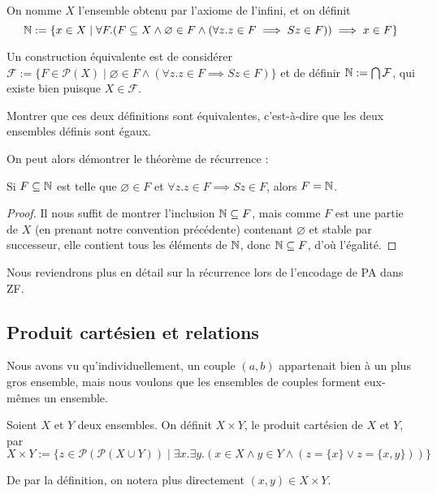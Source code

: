 \begin{defi}
    On nomme $X$ l'ensemble obtenu par l'axiome de l'infini, et on définit $$\mathbb{N} := \{ x \in X \mid \forall F.(F\subseteq X \land \varnothing \in F\land (\forall z.z\in F\implies Sz \in F))\implies x\in F\}$$

    Un construction équivalente est de considérer $\mathcal F := \{F\in\mathcal P(X)\mid \varnothing \in F \land (\forall z. z\in F \implies Sz \in F)\}$ et de définir $\mathbb{N} := \bigcap \mathcal F$, qui existe bien puisque $X\in\mathcal F$.
\end{defi}

\begin{exo}
    Montrer que ces deux définitions sont équivalentes, c'est-à-dire que les deux ensembles définis sont égaux.
\end{exo}

On peut alors démontrer le théorème de récurrence :

\begin{prop}[Récurrence]
    Si $F\subseteq \mathbb{N}$ est telle que $\varnothing \in F$ et $\forall z.z\in F \implies Sz\in F$, alors $F=\mathbb{N}$.
\end{prop}

\begin{proof}
    Il nous suffit de montrer l'inclusion $\mathbb{N}\subseteq F$, mais comme $F$ est une partie de $X$ (en prenant notre convention précédente) contenant $\varnothing$ et stable par successeur, elle contient tous les éléments de $\mathbb{N}$, donc $\mathbb{N}\subseteq F$, d'où l'égalité.
\end{proof}

Nous reviendrons plus en détail sur la récurrence lors de l'encodage de PA dans ZF.

\subsection{Produit cartésien et relations}

Nous avons vu qu'individuellement, un couple $(a,b)$ appartenait bien à un plus gros ensemble, mais nous voulons que les ensembles de couples forment eux-mêmes un ensemble.

\begin{defi}
    Soient $X$ et $Y$ deux ensembles. On définit $X\times Y$, le produit cartésien de $X$ et $Y$, par $$X\times Y := \{ z\in \mathcal P(\mathcal P(X\cup Y)) \mid \exists x.\exists y. (x\in X\land y\in Y \land (z = \{x\} \lor z = \{x,y\}))\}$$

    De par la définition, on notera plus directement $(x,y)\in X\times Y$.
\end{defi}


